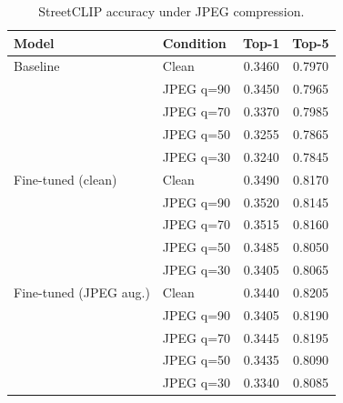 \begin{table}[t]
\centering
\caption{StreetCLIP accuracy under JPEG compression.}
\label{tab:streetclip-topk}
\begin{tabular}{llcc}
\toprule
Model & Condition & Top-1 & Top-5 \\
\midrule
Baseline & Clean & 0.3460 & 0.7970 \\
 & JPEG q=90 & 0.3450 & 0.7965 \\
 & JPEG q=70 & 0.3370 & 0.7985 \\
 & JPEG q=50 & 0.3255 & 0.7865 \\
 & JPEG q=30 & 0.3240 & 0.7845 \\
\midrule
Fine-tuned (clean) & Clean & 0.3490 & 0.8170 \\
 & JPEG q=90 & 0.3520 & 0.8145 \\
 & JPEG q=70 & 0.3515 & 0.8160 \\
 & JPEG q=50 & 0.3485 & 0.8050 \\
 & JPEG q=30 & 0.3405 & 0.8065 \\
\midrule
Fine-tuned (JPEG aug.) & Clean & 0.3440 & 0.8205 \\
 & JPEG q=90 & 0.3405 & 0.8190 \\
 & JPEG q=70 & 0.3445 & 0.8195 \\
 & JPEG q=50 & 0.3435 & 0.8090 \\
 & JPEG q=30 & 0.3340 & 0.8085 \\
\bottomrule
\end{tabular}
\end{table}